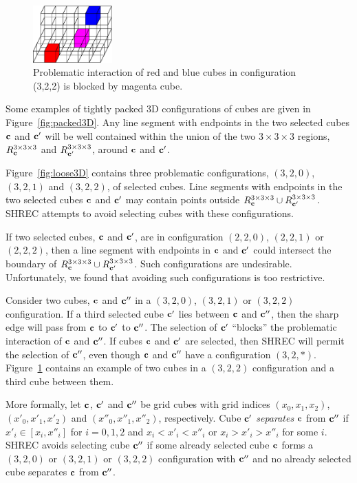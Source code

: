 \begin{figure}[t]
\centering

\includegraphics[width=1.2in]{images/config3D_3_2_2_B.eps}

\caption{Problematic interaction of red and blue cubes
in configuration (3,2,2) is blocked by magenta cube.}
\label{fig:blocked3D}
\end{figure}

Some examples of tightly packed 3D configurations of cubes are given
in Figure~\ref{fig:packed3D}.
Any line segment with endpoints in the two selected cubes $\mathbf{c}$ and $\mathbf{c}'$
will be well contained within the union 
of the two $3 \times 3 \times 3$ regions, 
$R^{3 \times 3 \times 3}_{\mathbf{c}}$ and $R^{3 \times 3 \times 3}_{\mathbf{c}'}$, around $\mathbf{c}$ and $\mathbf{c}'$.

Figure~\ref{fig:loose3D} contains three problematic configurations,
$(3,2,0)$, $(3,2,1)$ and $(3,2,2)$,
of  selected cubes.
Line segments with endpoints in the two selected cubes $\mathbf{c}$ and $\mathbf{c}'$
may contain points outside $R^{3 \times 3 \times 3}_{\mathbf{c}} \cup R^{3 \times 3 \times 3}_{\mathbf{c}'}$.
SHREC attempts to avoid selecting cubes with these configurations.

If two selected cubes, $\mathbf{c}$ and $\mathbf{c}'$, 
are in configuration $(2,2,0)$, $(2,2,1)$ or $(2,2,2)$,
then a line segment with endpoints in $\mathbf{c}$ and $\mathbf{c}'$
could intersect the boundary of $R^{3 \times 3 \times 3}_{\mathbf{c}} \cup R^{3 \times 3 \times 3}_{\mathbf{c}'}$.
Such configurations are undesirable.
Unfortunately, we found that avoiding such configurations is too restrictive.

Consider two cubes, $\mathbf{c}$ and $\mathbf{c}''$ 
in a $(3,2,0)$, $(3,2,1)$ or $(3,2,2)$ configuration.
If a third selected cube $\mathbf{c}'$ lies between $\mathbf{c}$ and $\mathbf{c}''$,
then the sharp edge will pass from $\mathbf{c}$ to $\mathbf{c}'$ to $\mathbf{c}''$.
The selection of $\mathbf{c}'$ ``blocks'' the problematic interaction 
of $\mathbf{c}$ and $\mathbf{c}''$.
If cubes $\mathbf{c}$ and $\mathbf{c}'$ are selected,
then SHREC will permit the selection of $\mathbf{c}''$,
even though $\mathbf{c}$ and $\mathbf{c}''$ have a configuration $(3,2,*)$.
Figure~\ref{fig:blocked3D} contains an example of two cubes 
in a $(3,2,2)$ configuration and a third cube between them.

More formally,
let $\mathbf{c}$, $\mathbf{c}'$ and $\mathbf{c}''$ be grid cubes with grid indices
$(x_0,x_1,x_2)$, $(x'_0,x'_1,x'_2)$ and $(x''_0,x''_1,x''_2)$, respectively.
Cube $\mathbf{c}'$ {\em separates} $\mathbf{c}$ from $\mathbf{c}''$
if $x'_i \in [x_i,x''_i]$ for $i = 0,1,2$
and $x_i < x'_i < x''_i$ or $x_i > x'_i > x''_i$ for some $i$.
SHREC avoids selecting cube $\mathbf{c}''$ if some already selected cube $\mathbf{c}$
forms a $(3,2,0)$ or $(3,2,1)$ or $(3,2,2)$ configuration with $\mathbf{c}''$
and no already selected cube separates $\mathbf{c}$ from $\mathbf{c}''$.


